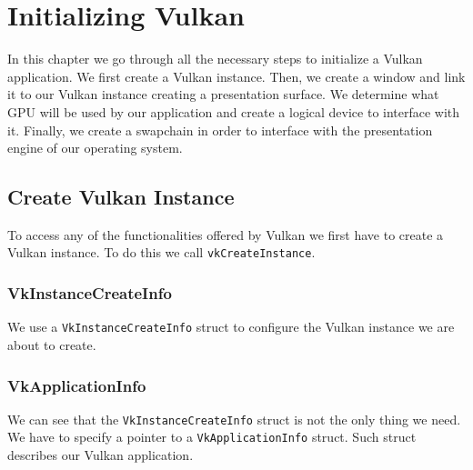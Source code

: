 \chapter{Initializing Vulkan}
\label{chap:InitializingVulkan}

In this chapter we go through all the necessary steps to initialize a
Vulkan application.
We first create a Vulkan instance.
Then, we create a window and link it to our Vulkan instance creating a presentation
surface.
We determine what GPU will be used by our application and create a logical device
to interface with it.
Finally, we create a swapchain in order to interface with the presentation engine
of our operating system.

\section{Create Vulkan Instance}

To access any of the functionalities offered by Vulkan we first have to create a Vulkan
instance.
To do this we call \texttt{vkCreateInstance}.

\begin{minipage}{\linewidth}{\noindent}
    
\end{minipage}

\subsection{VkInstanceCreateInfo}

We use a \texttt{VkInstanceCreateInfo} struct to configure the Vulkan
instance we are about to create.

\begin{minipage}{\linewidth}{\noindent}

\end{minipage}

\subsection{VkApplicationInfo}

We can see that the \texttt{VkInstanceCreateInfo} struct is not the only thing we need.
We have to specify a pointer to a \texttt{VkApplicationInfo} struct.
Such struct describes our Vulkan application.

